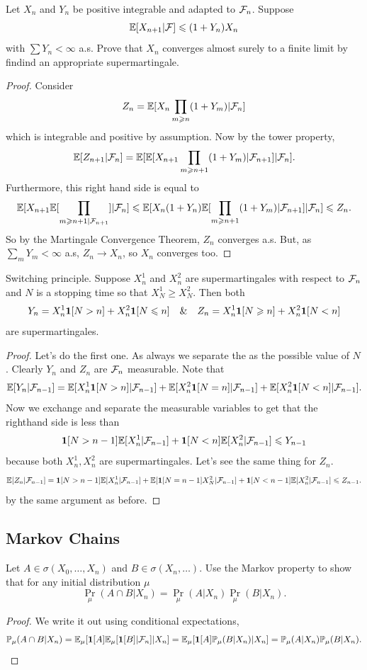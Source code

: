 \begin{exercise}[4.2.8]
	Let $X_n$ and $Y_n$ be positive integrable and adapted to $\mathcal{F}_n$.
	Suppose
	\[
		\mathbb{E}[X_{n+1} | \mathcal{F}] \leqslant (1 + Y_n)X_n
	\]
	with $\sum Y_n < \infty$ a.s. Prove that $X_n$ converges almost surely
	to a finite limit by findind an appropriate supermartingale.
\end{exercise}
\begin{proof}
	Consider
	\[
		Z_n = \mathbb{E}[X_n\prod_{m \geqslant n}(1 + Y_m)|\mathcal{F}_n]
	\]
	which is integrable and positive by assumption. Now by the tower
	property,
	\[
		\mathbb{E}[Z_{n+1}| \mathcal{F}_n] =
		\mathbb{E}[\mathbb{E}[X_{n+1} \prod_{m \geqslant n+1}(1 + Y_m) | \mathcal{F}_{n+1}] | \mathcal{F}_n].
	\]
	Furthermore, this right hand side is equal to
	\[
		\mathbb{E}[X_{n+1} \mathbb{E}[\prod_{m \geqslant n+1 | \mathcal{F}_{n+1}}] | \mathcal{F}_n] \leqslant
		\mathbb{E}[X_n(1+Y_n) \mathbb{E}[\prod_{m \geqslant n+1} (1 + Y_m)|\mathcal{F}_{n+1}] | \mathcal{F}_n] \leqslant Z_n.
	\]
	So by the Martingale Convergence Theorem, $Z_n$ converges a.s.
	But, as $\sum_m Y_m < \infty$ a.s, $Z_n \to X_n$, so $X_n$ converges
	too.
\end{proof}

\begin{exercise}[4.2.9]
	Switching principle. Suppose $X_n^1$ and $X_n^2$ are supermartingales
	with respect to $\mathcal{F}_n$ and $N$ is a stopping time so that $X_N^1 \geq X_N^2$.
	Then both
	\[
		Y_n = X_n^1 \bm{1}[N > n] + X_n^2 \bm{1}[N \leqslant n] \quad \& \quad
		Z_n = X_n^1 \bm{1}[N \geqslant n] + X_n^2 \bm{1}[N < n]
	\]
	are supermartingales.
\end{exercise}
\begin{proof}
	Let's do the first one. As always we separate the as the possible
	value of $N$. Clearly $Y_n$ and $Z_n$ are $\mathcal{F}_n$ measurable.
	Note that
	\[
		\mathbb{E}[Y_{n} | \mathcal{F}_{n-1}] =
		\mathbb{E}[X_{n}^1 \bm{1}[N > n] | \mathcal{F}_{n-1}] + \mathbb{E}[X_{n}^2\bm{1}[N = n]|\mathcal{F}_{n-1}]
		+ \mathbb{E}[X_{n}^2 \bm{1} [N < n] | \mathcal{F}_{n-1}].
	\]
	Now we exchange and separate the measurable variables to get that
	the righthand side is less than
	\[
		\bm{1}[N > n-1]\mathbb{E}[X_{n}^1 | \mathcal{F}_{n-1}] + \bm{1}[N <
		n]\mathbb{E}[X_n^2|\mathcal{F}_{n-1}] \leqslant Y_{n-1}
	\]
	because both $X_n^1, X_n^2$ are supermartingales. Let's see the same
	thing for $Z_n$.
	\[
		\mathbb{E}[Z_n | \mathcal{F}_{n-1}] = \bm{1}[N > n-1]\mathbb{E}[X_{n}^1|\mathcal{F}_{n-1}] +
		\mathbb{E}[\bm{1}[N = n-1]X_{N}^2 | \mathcal{F}_{n-1}]
		+ \bm{1}[N < n-1] \mathbb{E}[X_n^2 | \mathcal{F}_{n-1}] \leqslant Z_{n-1}.
	\]
	by the same argument as before.
\end{proof}

\subsection{Markov Chains}
\begin{exercise}[5.2.1]
	Let $A \in \sigma(X_0, \dots, X_n)$ and $B \in \sigma(X_n, \dots)$. Use
	the Markov property to show that for any initial distribution
	$\mu$
	\[
		\Pr_\mu(A \cap B | X_n) = \Pr_\mu(A | X_n) \Pr_\mu(B | X_n).
	\]
\end{exercise}
\begin{proof}
	We write it out using conditional expectations,
	\[
		\mathbb{P}_\mu(A \cap B | X_n) = \mathbb{E}_\mu[\bm{1}[A]\mathbb{E}_\mu[\bm{1}[B]|\mathcal{F}_n]|X_n]
		= \mathbb{E}_\mu[\bm{1}[A] \mathbb{P}_\mu(B|X_n) | X_n] = \mathbb{P}_\mu(A | X_n) \mathbb{P}_\mu(B | X_n).
	\]
\end{proof}

